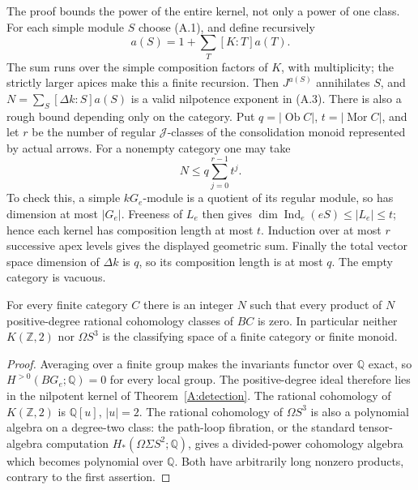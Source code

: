 \begin{remark}\label{A:detection-exponent}
The proof bounds the power of the entire kernel, not only a power of one
class. For each simple module $S$ choose (A.1), and define recursively
\[
 a(S)=1+\sum_T[K:T]a(T).
\]
The sum runs over the simple composition factors of $K$, with multiplicity;
the strictly larger apices make this a finite recursion. Then $J^{a(S)}$
annihilates $S$, and
$N=\sum_S[\Delta k:S]a(S)$ is a valid nilpotence exponent in (A.3).
There is also a rough bound depending only on the category. Put
$q=|\operatorname{Ob}C|$, $t=|\operatorname{Mor}C|$, and let $r$ be the
number of regular $\mathcal J$-classes of the consolidation monoid
represented by actual arrows. For a nonempty category one may take
\[
 N\leq q\sum_{j=0}^{r-1}t^j.
\]
To check this, a simple $kG_e$-module is a quotient of its regular module,
so has dimension at most $|G_e|$. Freeness of $L_e$ then gives
$\dim\operatorname{Ind}_e(eS)\leq |L_e|\leq t$; hence each kernel has
composition length at most $t$. Induction over at most $r$ successive
apex levels gives the displayed geometric sum. Finally the total vector
space dimension of $\Delta k$ is $q$, so its composition length is at most
$q$. The empty category is vacuous.
\end{remark}

\begin{corollary}\label{A:rational-nilpotence}
For every finite category $C$ there is an integer $N$ such that every
product of $N$ positive-degree rational cohomology classes of $BC$ is zero.
In particular neither $K(\mathbb Z,2)$ nor $\Omega S^3$ is the classifying
space of a finite category or finite monoid.
\end{corollary}
\begin{proof}
Averaging over a finite group makes the invariants functor over
$\mathbb Q$ exact, so $H^{>0}(BG_e;\mathbb Q)=0$ for every local group.
The positive-degree ideal therefore lies in the nilpotent kernel of
Theorem~\ref{A:detection}. The rational cohomology of $K(\mathbb Z,2)$ is
$\mathbb Q[u]$, $|u|=2$. The rational cohomology of $\Omega S^3$ is also a
polynomial algebra on a degree-two class: the path-loop fibration, or the
standard tensor-algebra computation $H_*(\Omega\Sigma S^2;\mathbb Q)$,
gives a divided-power cohomology algebra which becomes polynomial over
$\mathbb Q$. Both have arbitrarily long nonzero products, contrary to the
first assertion.
\end{proof}

